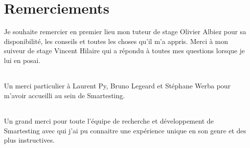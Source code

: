 \chapter*{Remerciements}

Je souhaite remercier en premier lieu mon tuteur de stage Olivier Albiez pour sa disponibilité, les conseils et toutes les choses qu'il m'a appris. Merci à mon suiveur de stage Vincent Hilaire qui a répondu à toutes mes questions lorsque je lui en posai.

\subparagraph*{}
Un merci particulier à Laurent Py, Bruno Legeard et Stéphane Werba pour m'avoir accueilli au sein de Smartesting.

\subparagraph*{}
Un grand merci pour toute l'équipe de recherche et développement de Smartesting avec qui j'ai pu connaitre une expérience unique en son genre et des plus instructives.

